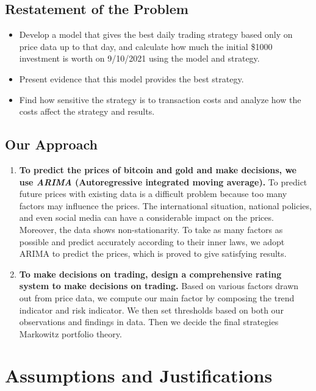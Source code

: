 \documentclass[12pt,a4paper]{article}
\newcommand{\Predictor}{ARIMA }
\begin{document}
\begin{spacing}{1.2}
\subsection{Restatement of the Problem}

\begin{itemize}
	\item Develop a model that gives the best daily trading strategy based only on price data up 
	to that day, and calculate how much the initial \$1000 investment is worth on 9/10/2021 using the 
	model and strategy.
	
	\item Present evidence that this model provides the best strategy.
	
	\item Find how sensitive the strategy is to transaction costs and analyze how the costs
	affect the strategy and results.
	
\end{itemize}

\subsection{Our Approach}

\begin{enumerate}
	\item \textbf{To predict the prices of bitcoin and gold and make decisions, we use \textit{\Predictor} (Autoregressive integrated moving average).}
	To predict future prices with existing data is a difficult problem because too many factors may influence the prices. The international situation, national policies, and even social media can have a considerable impact on the prices. Moreover, the data shows non-stationarity. To take as many factors as possible and predict accurately according to their inner laws, we adopt \Predictor to predict the prices, which is proved to give satisfying results.
	
	\item \textbf{To make decisions on trading, design a comprehensive rating system to make decisions on trading.} Based on various factors drawn out from price data, we compute our main factor by composing the trend indicator and risk indicator. We then set thresholds based on both our observations and findings in data. Then we decide the final strategies Markowitz portfolio theory.
\end{enumerate}

\section{Assumptions and Justifications}
\label{Assumptions_Justifications}


\end{spacing}
\end{document}
